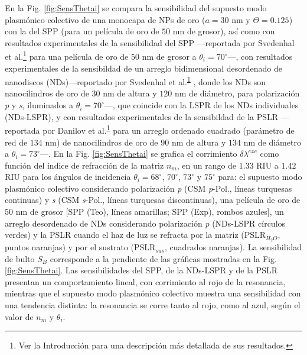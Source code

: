En la Fig. \ref{fig:SensThetai} se compara la sensibilidad del supuesto modo  plasmónico colectivo de una monocapa de NPs de oro ($a=30$ nm y $\Theta=0.125$) con la del SPP (para un película de oro de $50$ nm de grosor), así como con resultados experimentales de la sensibilidad del SPP ---reportada por  Svedenhal et al.\footnote{\label{fn:Motivacion}Ver la Introducción para una descripción más detallada de sus resultados.} \cite{svedendahl2009refractometric} para una película de oro de $50$ nm de grosor a $\theta_i = 70^\circ$---, con resultados experimentales de la sensibildad de un  arreglo bidimensional desordenado de nanodiscos (NDs)---reportado por Svedenhal et al.\textsuperscript{\ref{fn:Motivacion}}  \cite{svedendahl2009refractometric}, donde los NDs son nanocilindros de oro de $30$ nm de altura y $120$ nm de diámetro, para polarización \emph{p} y \emph{s}, iluminados a $\theta_i = 70^\circ$---, que coincide con la LSPR de los NDs individuales (NDs-LSPR), y con resultados experimentales de la sensibildad de la PSLR ---reportada por Danilov et al.\textsuperscript{\ref{fn:Motivacion}} \cite{danilov2018ultra} para un arreglo ordenado cuadrado (parámetro de red de $134$ nm) de nanocilindros de oro de $90$ nm de altura y $134$ nm de diámetro a $\theta_i= 73^\circ$---. En la Fig. \ref{fig:SensThetai} se grafica el corrimiento $\delta\lambda^{exc}$ como función del índice de refracción de la matriz $n_m$, en un rango de $1.33$ RIU a $1.42$ RIU para los ángulos de incidencia $\theta_i = 68^\circ$, $70^\circ$, $73^\circ$ y $75^\circ$ para: el supuesto modo  plasmónico colectivo considerando polarización \emph{p} (CSM \textit{p}-Pol., líneas turquesas continuas) y \emph{s} (CSM \textit{s}-Pol., líneas turquesas discontinuas), una película de oro de $50$ nm de grosor [SPP (Teo), líneas amarillas; SPP (Exp), rombos azules], un arreglo desordenado de NDs  considerando polarización \emph{p} (NDs-LSPR círculos verdes) y la PSLR cuando el haz de luz se refracta por la matriz (PSLR$_{H_{2}O}$, puntos naranjas) y por el sustrato (PSLR$_{sus}$, cuadrados naranjas). La sensibilidad de bulto $S_B$ corresponde a la pendiente de las gráficas mostradas en la Fig. \ref{fig:SensThetai}. Las sensibilidades del SPP, de la NDs-LSPR y de la PSLR presentan un comportamiento lineal, con corrimiento al rojo de la resonancia, mientras que el supuesto modo  plasmónico colectivo muestra una sensibilidad con una tendencia distinta: la resonancia se corre tanto al rojo, como al azul, según el valor de $n_m$ y $\theta_i$.

